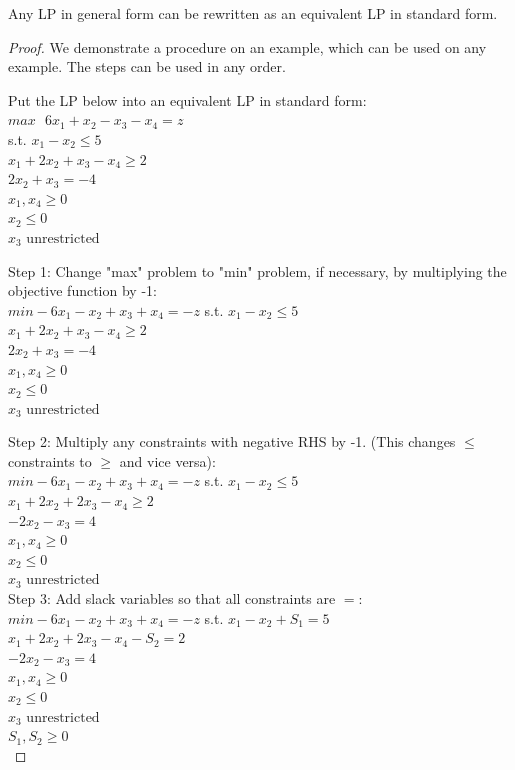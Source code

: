 \documentclass{article}
\begin{document}
\begin{proposition}
    Any LP in general form can be rewritten as an equivalent LP in standard form.
\end{proposition}
\begin{proof}
    We demonstrate a procedure on an example, which can be used on any example. The 
    steps can be used in any order. 

    Put the LP below into an equivalent LP in standard form:\\
    \(max \text{ } 6x_1+x_2-x_3-x_4=z\)\\
    s.t. \(x_1-x_2\leq5\) \\
    \(x_1+2x_2+x_3-x_4\geq 2\) \\
    \(2x_2+x_3=-4\) \\
    \(x_1, x_4 \geq 0\) \\
    \(x_2\leq0\) \\
    \(x_3 \text { unrestricted}\)
    
    Step 1: Change "max" problem to "min" problem, if necessary, by multiplying the 
    objective function by -1: \\
    \(min \text{} -6x_1-x_2+x_3+x_4=-z\)
    s.t. \(x_1-x_2\leq5\) \\
    \(x_1+2x_2+x_3-x_4\geq 2\) \\
    \(2x_2+x_3=-4\) \\
    \(x_1, x_4 \geq 0\) \\
    \(x_2\leq0\) \\
    \(x_3 \text { unrestricted}\) 

    Step 2: Multiply any constraints with negative RHS by -1. (This changes 
    \(\leq\) constraints to \(\geq\) and vice versa): \\
    \(min \text{} -6x_1-x_2+x_3+x_4=-z\)
    s.t. \(x_1-x_2\leq5\) \\
    \(x_1+2x_2+2x_3-x_4\geq2\) \\
    \(-2x_2-x_3=4\) \\
    \(x_1, x_4 \geq 0\) \\
    \(x_2\leq 0\) \\
    \(x_3 \text{ unrestricted}\) \\
    
    Step 3: Add slack variables so that all constraints are \(=\): \\
    \(min \text{} -6x_1-x_2+x_3+x_4=-z\)
    s.t. \(x_1-x_2+S_1=5\) \\
    \(x_1+2x_2+2x_3-x_4-S_2=2\) \\
    \(-2x_2-x_3=4\) \\
    \(x_1, x_4\geq 0\) \\
    \(x_2\leq 0\) \\
    \(x_3 \text{ unrestricted}\) \\
    \(S_1, S_2\geq 0\) \\
    

\end{proof}
\end{document}
